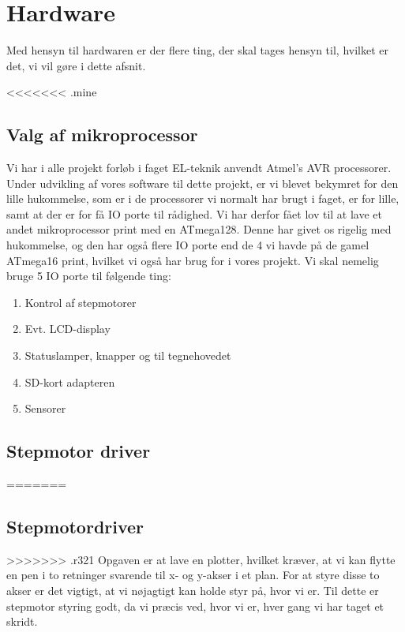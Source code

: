 \chapter[Design af hardware]{Hardware}
\label{ch:d-hardware}


Med hensyn til hardwaren er der flere ting, der skal tages hensyn
til, hvilket er det, vi vil gøre i dette afsnit.

<<<<<<< .mine
\section{Valg af mikroprocessor}
\label{sc:d-mikroprocessor}
Vi har i alle projekt forløb i faget EL-teknik anvendt Atmel's AVR
processorer. Under udvikling af vores software til dette projekt, er
vi blevet bekymret for den lille hukommelse, som er i de processorer
vi normalt har brugt i faget, er for lille, samt at der er for få IO
porte til rådighed.  Vi har derfor fået lov til at lave et andet
mikroprocessor print med en ATmega128. Denne har givet os rigelig med
hukommelse, og den har også flere IO porte end de 4 vi havde på de
gamel ATmega16 print, hvilket vi også har brug for i vores projekt. Vi
skal nemelig bruge 5 IO porte til følgende ting:

\begin{enumerate} \firmlist
\item{Kontrol af stepmotorer}
\item{Evt. LCD-display}
\item{Statuslamper, knapper og til tegnehovedet}
\item{SD-kort adapteren}
\item{Sensorer}
\end{enumerate}

\section{Stepmotor driver}
=======

\section{Stepmotordriver}

>>>>>>> .r321
Opgaven er at lave en plotter, hvilket kræver, at vi kan flytte en pen
i to retninger svarende til x- og y-akser i et plan. For at styre
disse to akser er det vigtigt, at vi nøjagtigt kan holde styr på, hvor vi
er. Til dette er stepmotor styring godt, da vi præcis ved, hvor vi er,
hver gang vi har taget et skridt.

